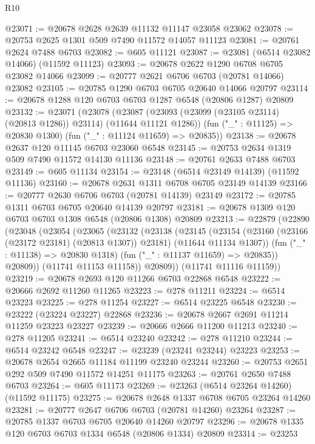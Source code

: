 \begin{lexlean}{R10}
\begin{coremodule}
@23071 := @20678 @2628 @2639 @11132 @11147 @23058 @23062
@23078 := @20753 @2625 @1301 @509 @7490 @11572 @14057 @11123
@23081 := @20761 @2624 @7488 @6703
@23082 := @605 @11121
@23087 := @23081 (@6514 @23082 @14066) (@11592 @11123)
@23093 := @20678 @2622 @1290 @6708 @6705 @23082 @14066
@23099 := @20777 @2621 @6706 @6703 (@20781 @14066) @23082
@23105 := @20785 @1290 @6703 @6705 @20640 @14066 @20797
@23114 := @20678 @1288 @120 @6703 @6703 @1287 @6548 (@20806 @1287) @20809
@23132 := @23071
    (@23078
      (@23087 (@23093 (@23099 (@23105 @23114) (@20813 @1286)) @23114) (@11644 @11121 @1286))
      (fun ("_" : @11125) => @20830 @1300)
      (fun ("_" : @11124 @11659) => @20835))
@23138 := @20678 @2637 @120 @11145 @6703 @23060 @6548
@23145 := @20753 @2634 @1319 @509 @7490 @11572 @14130 @11136
@23148 := @20761 @2633 @7488 @6703
@23149 := @605 @11134
@23154 := @23148 (@6514 @23149 @14139) (@11592 @11136)
@23160 := @20678 @2631 @1311 @6708 @6705 @23149 @14139
@23166 := @20777 @2630 @6706 @6703 (@20781 @14139) @23149
@23172 := @20785 @1311 @6703 @6705 @20640 @14139 @20797
@23181 := @20678 @1309 @120 @6703 @6703 @1308 @6548 (@20806 @1308) @20809
@23213 := @22879
    (@22890
      (@23048
        (@23054
          (@23065
            (@23132
              (@23138
                (@23145
                  (@23154
                    (@23160 (@23166 (@23172 @23181) (@20813 @1307)) @23181)
                    (@11644 @11134 @1307))
                  (fun ("_" : @11138) => @20830 @1318)
                  (fun ("_" : @11137 @11659) => @20835))
                @20809))
            (@11741 @11153 @11158))
          @20809))
      (@11741 @11116 @11159))
@23219 := @20678 @2693 @120 @11266 @6703 @22868 @6548
@23222 := @20666 @2692 @11260 @11265
@23223 := @278 @11211
@23224 := @6514 @23223
@23225 := @278 @11254
@23227 := @6514 @23225 @6548
@23230 := @23222 (@23224 @23227) @22868
@23236 := @20678 @2667 @2691 @11214 @11259 @23223 @23227
@23239 := @20666 @2666 @11200 @11213
@23240 := @278 @11205
@23241 := @6514 @23240
@23242 := @278 @11210
@23244 := @6514 @23242 @6548
@23247 := @23239 (@23241 @23244) @23223
@23253 := @20678 @2654 @2665 @11184 @11199 @23240 @23244
@23260 := @20753 @2651 @292 @509 @7490 @11572 @14251 @11175
@23263 := @20761 @2650 @7488 @6703
@23264 := @605 @11173
@23269 := @23263 (@6514 @23264 @14260) (@11592 @11175)
@23275 := @20678 @2648 @1337 @6708 @6705 @23264 @14260
@23281 := @20777 @2647 @6706 @6703 (@20781 @14260) @23264
@23287 := @20785 @1337 @6703 @6705 @20640 @14260 @20797
@23296 := @20678 @1335 @120 @6703 @6703 @1334 @6548 (@20806 @1334) @20809
@23314 := @23253

\end{coremodule}
\end{lexlean}
